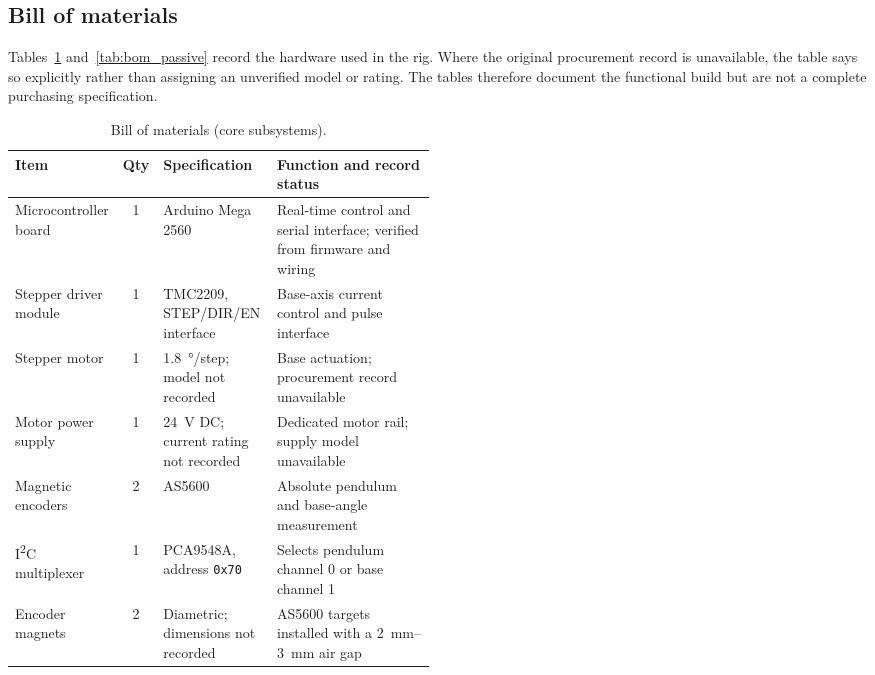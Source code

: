 \subsection{Bill of materials}
\label{sec:bom}
Tables~\ref{tab:bom} and~\ref{tab:bom_passive} record the hardware used in
the rig. Where the original procurement record is unavailable, the table says
so explicitly rather than assigning an unverified model or rating. The tables
therefore document the functional build but are not a complete purchasing
specification.

\begin{table}[htbp]
  \centering
  \footnotesize
  \setlength{\tabcolsep}{5pt}
  \caption{Bill of materials (core subsystems).}
  \label{tab:bom}
  \begin{tabularx}{\linewidth}{@{}p{0.22\linewidth} c p{0.27\linewidth} X@{}}
    \toprule
    Item & Qty & Specification & Function and record status \\
    \midrule
    Microcontroller board & 1 & Arduino Mega 2560 & Real-time control and serial interface; verified from firmware and wiring \\
    Stepper driver module & 1 & TMC2209, STEP/DIR/EN interface & Base-axis current control and pulse interface \\
    Stepper motor & 1 & \SI{1.8}{\degree}/step; model not recorded & Base actuation; procurement record unavailable \\
    Motor power supply & 1 & \SI{24}{V} DC; current rating not recorded & Dedicated motor rail; supply model unavailable \\
    Magnetic encoders & 2 & AS5600 & Absolute pendulum and base-angle measurement \\
    I\textsuperscript{2}C multiplexer & 1 & PCA9548A, address \texttt{0x70} & Selects pendulum channel 0 or base channel 1 \\
    Encoder magnets & 2 & Diametric; dimensions not recorded & AS5600 targets installed with a \SIrange{2}{3}{mm} air gap \\
    \bottomrule
  \end{tabularx}
\end{table}

